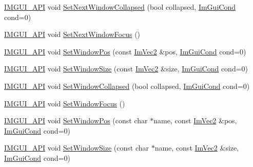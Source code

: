\begin{DoxyCompactItemize}
\item 
\mbox{\hyperlink{imgui_8h_a43829975e84e45d1149597467a14bbf5}{I\+M\+G\+U\+I\+\_\+\+A\+PI}} void \mbox{\hyperlink{namespace_im_gui_a3e9380e253a3c49665a404e56950a52a}{Set\+Next\+Window\+Collapsed}} (bool collapsed, \mbox{\hyperlink{imgui_8h_aef890d6ac872e12c5804d0b3e4f7f103}{Im\+Gui\+Cond}} cond=0)
\item 
\mbox{\hyperlink{imgui_8h_a43829975e84e45d1149597467a14bbf5}{I\+M\+G\+U\+I\+\_\+\+A\+PI}} void \mbox{\hyperlink{namespace_im_gui_ac2d2b163c95cd8c8391aba85bc50d170}{Set\+Next\+Window\+Focus}} ()
\item 
\mbox{\hyperlink{imgui_8h_a43829975e84e45d1149597467a14bbf5}{I\+M\+G\+U\+I\+\_\+\+A\+PI}} void \mbox{\hyperlink{namespace_im_gui_aaa81e004de4c0a5cedb836e92e8aa0e5}{Set\+Window\+Pos}} (const \mbox{\hyperlink{struct_im_vec2}{Im\+Vec2}} \&pos, \mbox{\hyperlink{imgui_8h_aef890d6ac872e12c5804d0b3e4f7f103}{Im\+Gui\+Cond}} cond=0)
\item 
\mbox{\hyperlink{imgui_8h_a43829975e84e45d1149597467a14bbf5}{I\+M\+G\+U\+I\+\_\+\+A\+PI}} void \mbox{\hyperlink{namespace_im_gui_a657c6cc2246485332f608a5204447ea1}{Set\+Window\+Size}} (const \mbox{\hyperlink{struct_im_vec2}{Im\+Vec2}} \&size, \mbox{\hyperlink{imgui_8h_aef890d6ac872e12c5804d0b3e4f7f103}{Im\+Gui\+Cond}} cond=0)
\item 
\mbox{\hyperlink{imgui_8h_a43829975e84e45d1149597467a14bbf5}{I\+M\+G\+U\+I\+\_\+\+A\+PI}} void \mbox{\hyperlink{namespace_im_gui_ab5445711a74e0e1a58d1e464cdda252f}{Set\+Window\+Collapsed}} (bool collapsed, \mbox{\hyperlink{imgui_8h_aef890d6ac872e12c5804d0b3e4f7f103}{Im\+Gui\+Cond}} cond=0)
\item 
\mbox{\hyperlink{imgui_8h_a43829975e84e45d1149597467a14bbf5}{I\+M\+G\+U\+I\+\_\+\+A\+PI}} void \mbox{\hyperlink{namespace_im_gui_ac71920931ed7b7c8594ee84c6a94e7b8}{Set\+Window\+Focus}} ()
\item 
\mbox{\hyperlink{imgui_8h_a43829975e84e45d1149597467a14bbf5}{I\+M\+G\+U\+I\+\_\+\+A\+PI}} void \mbox{\hyperlink{namespace_im_gui_a32032b56f975bb3145adbe19f38f3b56}{Set\+Window\+Pos}} (const char $\ast$name, const \mbox{\hyperlink{struct_im_vec2}{Im\+Vec2}} \&pos, \mbox{\hyperlink{imgui_8h_aef890d6ac872e12c5804d0b3e4f7f103}{Im\+Gui\+Cond}} cond=0)
\item 
\mbox{\hyperlink{imgui_8h_a43829975e84e45d1149597467a14bbf5}{I\+M\+G\+U\+I\+\_\+\+A\+PI}} void \mbox{\hyperlink{namespace_im_gui_a441528b9198d4531e79337121212cd33}{Set\+Window\+Size}} (const char $\ast$name, const \mbox{\hyperlink{struct_im_vec2}{Im\+Vec2}} \&size, \mbox{\hyperlink{imgui_8h_aef890d6ac872e12c5804d0b3e4f7f103}{Im\+Gui\+Cond}} cond=0)

\end{DoxyCompactItemize}
